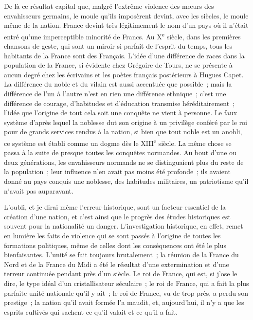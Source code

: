 \documentclass[french,twoside]{book} %
\newcommand\orgName[1]{#1}
\newcommand\persName[1]{#1}
\newcommand\placeName[1]{#1}
\begin{document}
De là ce résultat capital que, malgré l’extrême violence des mœurs des envahisseurs germains, le moule qu’ils imposèrent devint, avec les siècles, le moule même de la nation. {\placeName France} devint très légitimement le nom d’un pays où il n’était entré qu’une imperceptible minorité de {\orgName Francs}. Au X\textsuperscript{e} siècle, dans les premières chansons de geste, qui sont un miroir si parfait de l’esprit du temps, tous les habitants de la {\placeName France} sont des Français. L’idée d’une différence de races dans la population de la {\placeName France}, si évidente chez {\persName Grégoire de Tours}, ne se présente à aucun degré chez les écrivains et les poètes français postérieurs à {\persName Hugues Capet}. La différence du noble et du vilain est aussi accentuée que possible ; mais la différence de l’un à l’autre n’est en rien une différence ethnique ; c’est une différence de courage, d’habitudes et d’éducation transmise héréditairement ; l’idée que l’origine de tout cela soit une conquête ne vient à personne. Le faux système d’après lequel la noblesse dut son origine à un privilège conféré par le roi pour de grands services rendus à la nation, si bien que tout noble est un anobli, ce système est établi comme un dogme dès le XIII\textsuperscript{e} siècle. La même chose se passa à la suite de presque toutes les conquêtes normandes. Au bout d’une ou deux générations, les envahisseurs normands ne se distinguaient plus du reste de la population ; leur influence n’en avait pas moins été profonde ; ils avaient donné au pays conquis une noblesse, des habitudes militaires, un patriotisme qu’il n’avait pas auparavant.\par
L’oubli, et je dirai même l’erreur historique, sont un facteur essentiel de la création d’une nation, et c’est ainsi que le progrès des études historiques est souvent pour la nationalité un danger. L’investigation historique, en effet, remet en lumière les faits de violence qui se sont passés à l’origine de toutes les formations politiques, même de celles dont les conséquences ont été le plus bienfaisantes. L’unité se fait toujours brutalement ; la réunion de la {\placeName France du Nord} et de la {\placeName France du Midi} a été le résultat d’une extermination et d’une terreur continuée pendant près d’un siècle. Le {\persName roi de France}, qui est, si j’ose le dire, le type idéal d’un cristallisateur séculaire ; le {\persName roi de France}, qui a fait la plus parfaite unité nationale qu’il y ait ; le {\persName roi de France}, vu de trop près, a perdu son prestige ; la nation qu’il avait formée l’a maudit, et, aujourd’hui, il n’y a que les esprits cultivés qui sachent ce qu’il valait et ce qu’il a fait.\par
\end{document}
